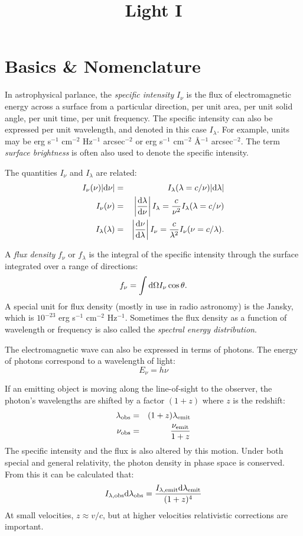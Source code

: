 \title{\bf Light I}

\section{Basics \& Nomenclature}

In astrophysical parlance, the {\it specific intensity} $I_\nu$ is the
flux of electromagnetic energy across a surface from a particular
direction, per unit area, per unit solid angle, per unit time, per
unit frequency. The specific intensity can also be expressed per unit
wavelength, and denoted in this case $I_\lambda$. For example, units
may be erg s$^{-1}$ cm$^{-2}$ Hz$^{-1}$ arcsec$^{-2}$ or erg s$^{-1}$
cm$^{-2}$ \AA$^{-1}$ arcsec$^{-2}$.  The term {\it surface brightness}
is often also used to denote the specific intensity.

The quantities $I_\nu$ and $I_\lambda$ are related:
\begin{eqnarray}
I_\nu(\nu) |{\rm d}\nu| &=& I_\lambda(\lambda = c/\nu) |{\rm
  d}\lambda| \cr
I_\nu(\nu) &=& \left|\frac{{\rm d}\lambda}{{\rm d}\nu}\right|
I_\lambda = \frac{c}{\nu^2} I_\lambda(\lambda = c/\nu) \cr
I_\lambda(\lambda) &=& \left|\frac{{\rm d}\nu}{{\rm d}\lambda}\right|
I_\nu = \frac{c}{\lambda^2} I_\nu(\nu = c/\lambda).
\end{eqnarray}

A {\it flux density} $f_\nu$ or $f_\lambda$ is the integral of the
specific intensity through the surface integrated over a range of
directions:
\begin{equation}
f_\nu = \int {\rm d}\Omega I_\nu \cos\theta. 
\end{equation}
A special unit for flux density (mostly in use in radio astronomy) is
the Jansky, which is $10^{-23}$ erg s$^{-1}$ cm$^{-2}$
Hz$^{-1}$. Sometimes the flux density as a function of wavelength or
frequency is also called the {\it spectral energy distribution}.

The electromagnetic wave can also be expressed in terms of
photons. The energy of photons correspond to a wavelength of light:
\begin{equation}
E_\nu = h\nu
\end{equation}

If an emitting object is moving along the line-of-sight to the
observer, the photon's wavelengths are shifted by a factor $(1+z)$
where $z$ is the redshift:
\begin{eqnarray}
\lambda_{\rm obs}  &=& (1+z) \lambda_{\rm emit} \cr
\nu_{\rm obs}  &=& \frac{\nu_{\rm emit}}{1+z}
\end{eqnarray}
The specific intensity and the flux is also altered by this
motion. Under both special and general relativity, the photon density
in phase space is conserved. From this it can be calculated that:
\begin{equation}
  \label{eq:sb_dimming}
  I_{\lambda, {\rm obs}} {\rm d}\lambda_{\rm obs} = 
  \frac{I_{\lambda, {\rm emit}} {\rm d}\lambda_{\rm emit}}{(1+z)^4}
\end{equation}
At small velocities, $z \approx v/c$, but at higher velocities
relativistic corrections are important.

